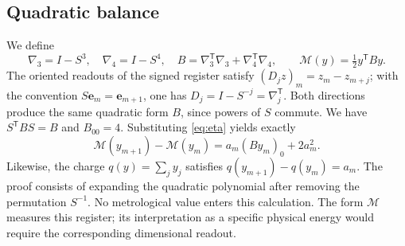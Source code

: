\subsection{Quadratic balance}
We define
\[
\nabla_3=I-S^3,\quad \nabla_4=I-S^4,\quad
B=\nabla_3^{\mathsf T}\nabla_3+\nabla_4^{\mathsf T}\nabla_4,\qquad
\mathcal M(y)=\tfrac12 y^{\mathsf T}By.
\]
The oriented readouts of the signed register satisfy
$(D_jz)_m=z_m-z_{m+j}$; with the convention
$S\mathbf e_m=\mathbf e_{m+1}$, one has
$D_j=I-S^{-j}=\nabla_j^{\mathsf T}$. Both directions produce the same
quadratic form $B$, since powers of $S$ commute.
We have $S^{\mathsf T}BS=B$ and $B_{00}=4$. Substituting
\eqref{eq:eta} yields exactly
\begin{equation}
\mathcal M(y_{m+1})-\mathcal M(y_m)
=a_m(By_m)_0+2a_m^2.
\label{mem:balance}
\end{equation}
Likewise, the charge $q(y)=\sum_jy_j$ satisfies
$q(y_{m+1})-q(y_m)=a_m$.
The proof consists of expanding the quadratic polynomial after removing the
permutation $S^{-1}$. No metrological value enters this calculation.
The form $\mathcal M$ measures this register; its interpretation as a
specific physical energy would require the corresponding dimensional readout.




